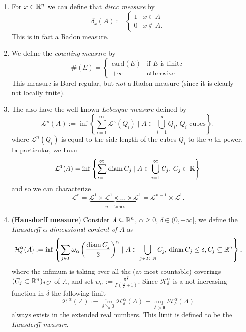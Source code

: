 \begin{examples}~
\begin{enumerate}[(1)]
\item For $x \in \mathbb{R}^n$ we can define that \emph{dirac measure} by  
\[
\delta_x(A) := 
\begin{cases}
1 & x \in A
\\
0 & x \not\in A.
\end{cases}
\]
This is in fact a Radon measure.
\item We define the \emph{counting measure} by
\[
\# (E) = 
\begin{cases}
\text{card}(E) & \text{if $E$ is finite}
\\
+\infty & \text{otherwise}.
\end{cases}
\]
This measure is Borel regular, but \emph{not} a Radon measure (since it is
clearly not locally finite).
\item The also have the well-known \emph{Lebesgue measure} defined by
\[
\mathcal{L}^n(A) := \inf \left\{\sum_{i=1}^\infty \mathcal{L}^n(Q_i) \mid A
\subset \bigcup_{i=1}^\infty Q_i,\, Q_i \text{ cubes}\right\},
\]
where $\mathcal{L}^n(Q_i)$ is equal to the side length of the cubes $Q_i$ to the
$n$-th power. In particular, we have
\[
\mathcal{L}^1(A) = \inf \left\{ \sum_{i=1}^\infty  \operatorname{diam} C_j \mid A
\subset \bigcup_{i=1}^\infty C_j, \, C_j \subset \mathbb{R} \right\}
\]
and so we can characterize
\[
\mathcal{L}^n = \underbrace{\mathcal{L}^1\times\mathcal{L}^1 \times \dots \times
\mathcal{L}^1}_{n-\text{times}} = \mathcal{L}^{n-1} \times \mathcal{L}^1.
\]
\item (\textbf{Hausdorff measure}) Consider $A \subseteq \mathbb{R}^n$, $\alpha \geq 0$, $\delta \in (0,+\infty]$, we
define the \emph{Hausdorff $\alpha$-dimensional content of $A$} as
\[
\mathcal{H}^\alpha_\delta(A) := \inf\left\{ \sum_{j\in I} \omega_\alpha
\left(\frac{\operatorname{diam} C_j}{2}\right)^\alpha \mid A \subset \bigcup_{j\in I \subset \mathbb{N}} C_j, \, \operatorname{diam}
C_j \leq \delta, C_j \subseteq \mathbb{R}^n \right\},
\]
where the infimum is taking over all the (at most countable) coverings $(C_j \subset
\mathbb{R}^n)_{j\in I}$ of $A$, and set $w_\alpha :=
\frac{\pi^{\frac{\alpha}{2}}}{\Gamma(\frac{\alpha}{2}+1)}$. Since
$\mathcal{H}^\alpha_\delta$ is a not-increasing function in $\delta$ the
following limit
\[
\mathcal{H}^\alpha(A) := \lim_{\delta \searrow 0} \mathcal{H}^\alpha_\delta (A) =
\sup_{\delta > 0} \mathcal{H}^\alpha_\delta(A)
\]
always exists in the extended real numbers. This limit is defined to be the
\emph{Hausdorff measure}.
\end{enumerate}
\end{examples}

